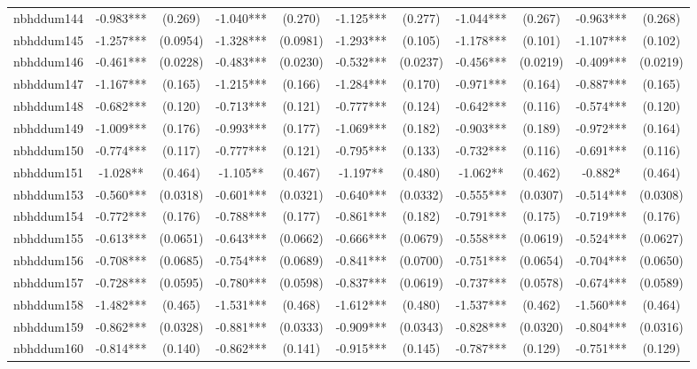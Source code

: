 \documentclass[]{article}
\begin{document}
\begin{tabular}{lcccccccccc}
nbhddum144 & -0.983*** & (0.269) & -1.040*** & (0.270) & -1.125*** & (0.277) & -1.044*** & (0.267) & -0.963*** & (0.268) \\
nbhddum145 & -1.257*** & (0.0954) & -1.328*** & (0.0981) & -1.293*** & (0.105) & -1.178*** & (0.101) & -1.107*** & (0.102) \\
nbhddum146 & -0.461*** & (0.0228) & -0.483*** & (0.0230) & -0.532*** & (0.0237) & -0.456*** & (0.0219) & -0.409*** & (0.0219) \\
nbhddum147 & -1.167*** & (0.165) & -1.215*** & (0.166) & -1.284*** & (0.170) & -0.971*** & (0.164) & -0.887*** & (0.165) \\
nbhddum148 & -0.682*** & (0.120) & -0.713*** & (0.121) & -0.777*** & (0.124) & -0.642*** & (0.116) & -0.574*** & (0.120) \\
nbhddum149 & -1.009*** & (0.176) & -0.993*** & (0.177) & -1.069*** & (0.182) & -0.903*** & (0.189) & -0.972*** & (0.164) \\
nbhddum150 & -0.774*** & (0.117) & -0.777*** & (0.121) & -0.795*** & (0.133) & -0.732*** & (0.116) & -0.691*** & (0.116) \\
nbhddum151 & -1.028** & (0.464) & -1.105** & (0.467) & -1.197** & (0.480) & -1.062** & (0.462) & -0.882* & (0.464) \\
nbhddum153 & -0.560*** & (0.0318) & -0.601*** & (0.0321) & -0.640*** & (0.0332) & -0.555*** & (0.0307) & -0.514*** & (0.0308) \\
nbhddum154 & -0.772*** & (0.176) & -0.788*** & (0.177) & -0.861*** & (0.182) & -0.791*** & (0.175) & -0.719*** & (0.176) \\
nbhddum155 & -0.613*** & (0.0651) & -0.643*** & (0.0662) & -0.666*** & (0.0679) & -0.558*** & (0.0619) & -0.524*** & (0.0627) \\
nbhddum156 & -0.708*** & (0.0685) & -0.754*** & (0.0689) & -0.841*** & (0.0700) & -0.751*** & (0.0654) & -0.704*** & (0.0650) \\
nbhddum157 & -0.728*** & (0.0595) & -0.780*** & (0.0598) & -0.837*** & (0.0619) & -0.737*** & (0.0578) & -0.674*** & (0.0589) \\
nbhddum158 & -1.482*** & (0.465) & -1.531*** & (0.468) & -1.612*** & (0.480) & -1.537*** & (0.462) & -1.560*** & (0.464) \\
nbhddum159 & -0.862*** & (0.0328) & -0.881*** & (0.0333) & -0.909*** & (0.0343) & -0.828*** & (0.0320) & -0.804*** & (0.0316) \\
nbhddum160 & -0.814*** & (0.140) & -0.862*** & (0.141) & -0.915*** & (0.145) & -0.787*** & (0.129) & -0.751*** & (0.129) \\

\end{tabular}
\end{document}
